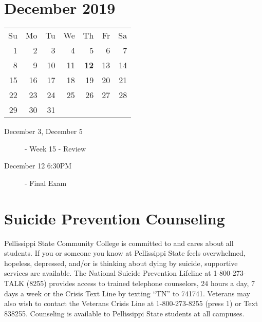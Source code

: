 \documentclass{article}
\begin{document}
\hrulefill

\section*{December 2019}
\begin{tabular}{rrrrrrr}
Su & Mo & Tu & We & Th & Fr & Sa\\
 1 &  2 &  3 &  4 &  5 &  6 &  7\\
 8 &  9 & 10 & 11 & {\bf 12} & 13 & 14\\
15 & 16 & 17 & 18 & 19 & 20 & 21\\
22 & 23 & 24 & 25 & 26 & 27 & 28\\
29 & 30 & 31 &    &    &    &   \\
\end{tabular}

\begin{description}
    \item[December 3, December 5] - Week 15 - Review
    \item[December 12 6:30PM] - Final Exam
\end{description}

\hrulefill

\section{Suicide Prevention Counseling}
Pellissippi State Community College is committed to and cares about
all students. If you or someone you know at Pellissippi State feels
overwhelmed, hopeless, depressed, and/or is thinking about dying by
suicide, supportive services are available. The National Suicide
Prevention Lifeline at 1-800-273-TALK (8255) provides access to
trained telephone counselors, 24 hours a day, 7 days a week or the
Crisis Text Line by texting ``TN'' to 741741. Veterans may also wish
to contact the Veterans Crisis Line at 1-800-273-8255 (press 1) or
Text 838255. Counseling is available to Pellissippi State students at
all campuses.
\end{document}
